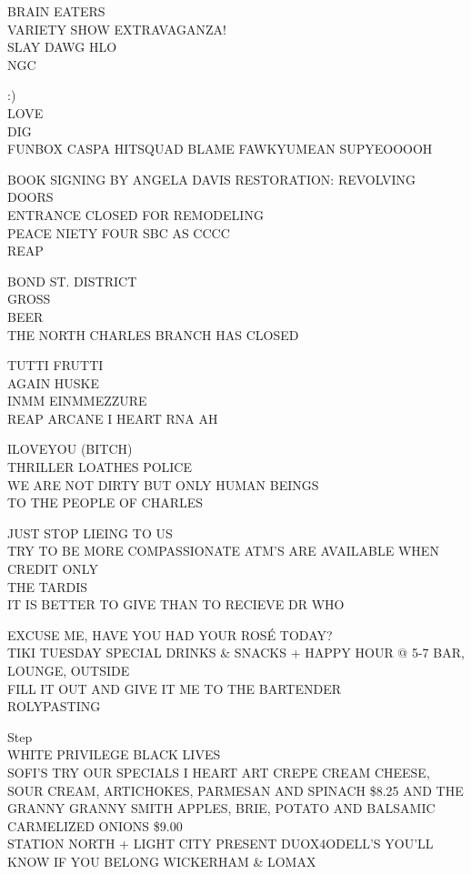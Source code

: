 \documentclass[10pt,letterpaper]{article}
\begin{document}
BRAIN EATERS\\
VARIETY SHOW EXTRAVAGANZA!\\
SLAY DAWG HLO\\
NGC

:)\\
LOVE\\
DIG\\
FUNBOX CASPA HITSQUAD BLAME FAWKYUMEAN SUPYEOOOOH

BOOK SIGNING BY ANGELA DAVIS RESTORATION: REVOLVING DOORS\\
ENTRANCE CLOSED FOR REMODELING\\
PEACE NIETY FOUR SBC AS CCCC\\
REAP

BOND ST. DISTRICT\\
GROSS\\
BEER\\
THE NORTH CHARLES BRANCH HAS CLOSED

TUTTI FRUTTI\\
AGAIN HUSKE\\
INMM EINMMEZZURE\\
REAP ARCANE I HEART RNA AH

ILOVEYOU (BITCH)\\
THRILLER LOATHES POLICE\\
WE ARE NOT DIRTY BUT ONLY HUMAN BEINGS\\
TO THE PEOPLE OF CHARLES

JUST STOP LIEING TO US\\
TRY TO BE MORE COMPASSIONATE ATM'S ARE AVAILABLE WHEN CREDIT ONLY\\
THE TARDIS\\
IT IS BETTER TO GIVE THAN TO RECIEVE DR WHO

EXCUSE ME, HAVE YOU HAD YOUR ROSÉ TODAY?\\
TIKI TUESDAY SPECIAL DRINKS \& SNACKS + HAPPY HOUR @ 5{-}7 BAR, LOUNGE, OUTSIDE\\
FILL IT OUT AND GIVE IT ME TO THE BARTENDER\\
ROLYPASTING

Step\\
WHITE PRIVILEGE BLACK LIVES\\
SOFI'S TRY OUR SPECIALS I HEART ART CREPE CREAM CHEESE, SOUR CREAM, ARTICHOKES, PARMESAN AND SPINACH \$8.25 AND THE GRANNY GRANNY SMITH APPLES, BRIE, POTATO AND BALSAMIC CARMELIZED ONIONS \$9.00\\
STATION NORTH + LIGHT CITY PRESENT DUOX4ODELL'S YOU'LL KNOW IF YOU BELONG WICKERHAM \& LOMAX
\end{document}
